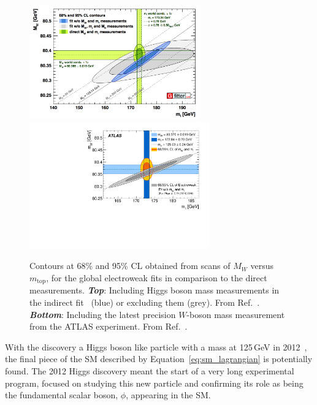 \begin{figure}[!htb]
    \begin{center}
        \includegraphics[width=0.65\textwidth]{figures/chapter1/sm_final/mw_vs_mt_indirect}
        \includegraphics[width=0.69\textwidth]{figures/chapter1/sm_final/atlas_w_boson_mass_mw_mt}
        \caption{
            Contours at 68\% and 95\% CL obtained from scans of $M_W$ versus $m_{\text{top}}$,
            for the global electroweak fits in comparison to the direct measurements.
            \textit{\textbf{Top}}: Including Higgs boson mass measurements in the indirect fit~\cite{HMassATLAS,HMassCMS} (blue)
                or excluding them (grey). From Ref.~\cite{GFitter}.
            \textit{\textbf{Bottom}}: Including the latest precision $W$-boson mass measurement from the ATLAS
                experiment. From Ref.~\cite{ATLASWMass}.
        }
        \label{fig:mw_mt_scan}
    \end{center}
\end{figure}

With the discovery a Higgs boson like particle with a mass at 125\,GeV in 2012~\cite{HDiscoveryATLAS,HDiscoveryCMS},
the final piece of the SM described by Equation~\ref{eq:sm_lagrangian} is potentially found.
The 2012 Higgs discovery meant the start of a very long experimental program, focused
on studying this new particle and confirming its role as being the fundamental scalar boson, $\phi$,
appearing in the SM.


